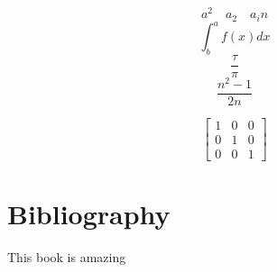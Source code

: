 \documentclass[14pt]{article}
\begin{document}
	$$a^2 \quad a_2 \quad a_in$$
	$$\int^a_bf(x)dx$$	
	$$\frac{\tau}{\pi}$$
	$$\frac{n^2-1}{2n}$$
	
	
	\begin{equation}
		\begin{bmatrix}
		1 & 0 & 0\\
		0 & 1 & 0\\
		0 & 0 & 1
		\end{bmatrix}
	\end{equation}

	\section{Bibliography}
	This book is \cite{redmon2016you} amazing
	
	
	
	
	
\end{document}
